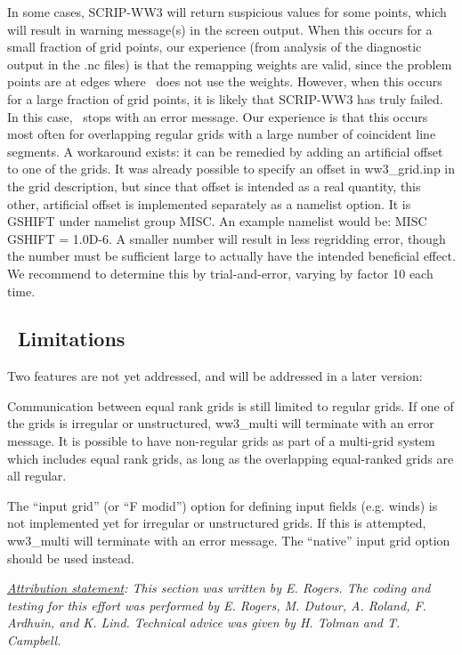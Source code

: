 In some cases, SCRIP-WW3 will return suspicious values for some points, which
will result in warning message(s) in the screen output. When this occurs for a
small fraction of grid points, our experience (from analysis of the diagnostic
output in the {\file .nc} files) is that the remapping weights are valid,
since the problem points are at edges where \ws\ does not use the
weights. However, when this occurs for a large fraction of grid points, it is
likely that SCRIP-WW3 has truly failed. In this case, \ws\ stops with an error
message. Our experience is that this occurs most often for overlapping regular
grids with a large number of coincident line segments. A workaround exists: it 
can be remedied by adding an artificial offset to one of the grids. It was already 
possible to specify an offset in {\file ww3\_grid.inp} in the grid description,
but since that offset is intended as a real quantity, this other, artificial 
offset is implemented separately as a namelist option. It is {\code GSHIFT} 
under namelist group {\F MISC}. An example namelist would be: {\code MISC 
GSHIFT = 1.0D-6}. A smaller number will result in less regridding error, 
though the number must be sufficient large to actually have the intended 
beneficial effect. We recommend to determine this by trial-and-error, varying 
by factor 10 each time. 

\vssub
\subsection{~Limitations} \label{sec:scripE}
\vssub

Two features are not yet addressed, and will be addressed in a later version:
\begin{list}{)\hfill}
            { \leftmargin 15mm 
             \rightmargin 5mm \itemsep 0mm \parsep 0mm}
\item  Communication between equal rank grids is still limited to regular
  grids. If one of the grids is irregular or unstructured, {\file ww3\_multi}
  will terminate with an error message. It is possible to have non-regular
  grids as part of a multi-grid system which includes equal rank grids, as
  long as the overlapping equal-ranked grids are all regular.

\item The ``input grid'' (or ``{F  modid}'') option for defining input fields
  (e.g. winds) is not implemented yet for irregular or unstructured grids. If
  this is attempted, {\file ww3\_multi} will terminate with an error
  message. The ``native'' input grid option should be used instead.

\end{list}

\noindent
\textrm{\textit{\underline{Attribution statement}: This section was written by
    E. Rogers. The coding and testing for this effort was performed by
    E. Rogers, M. Dutour, A. Roland, F. Ardhuin, and K. Lind. Technical advice
    was given by H. Tolman and T. Campbell.}}

